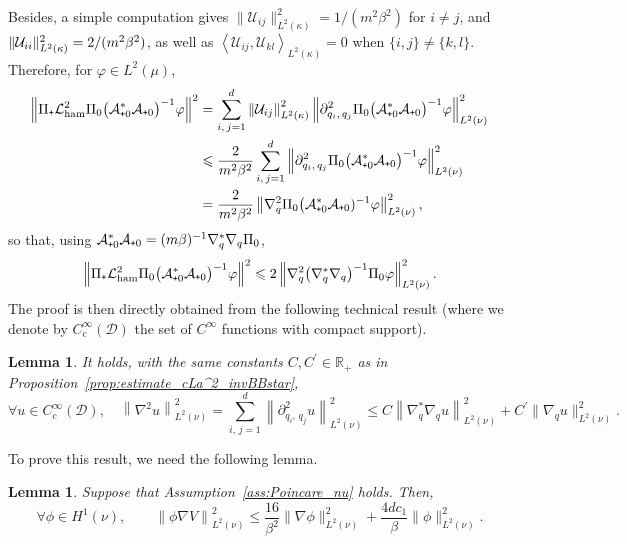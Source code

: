 \documentclass[10pt]{amsart}
\newtheorem{lemm}[theo]{Lemma}\newtheorem{prop}[theo]{Proposition}\newtheorem{coro}[theo]{Corollary}\newtheorem{conj}[theo]{Conjecture}
\theoremstyle{definition}\newtheorem{defi}[theo]{Definition}\newtheorem{rema}[theo]{Remark}\newtheorem{exam}[theo]{Example}\newtheorem{exem}[theo]{Example}\newtheorem{nota}[theo]{Notation}
\newcommand{\rmc}{\mathrm{c}}
\newcommand{\cLa}{\mathcal{A}}
\newcommand{\cD}{\mathcal{D}}
\newcommand{\cLU}{\mathcal{U}}
\newcommand{\R}{\mathbb{R}}
\newcommand{\cLham}{\mathcal{L}_{\rm ham}}
\newcommand{\subplus}{\textnormal{\texttt{+}}}
\renewcommand{\leq}{\leqslant}
\let\oldforall\forall
\renewcommand*{\forall}{\mathrel{\oldforall}}
\begin{document}
Besides, a simple computation gives $\|\cLU_{ij}\|_{L^2(\kappa)}^2 = 1/(m^2\beta^2)$ for $i\neq j$, and $\|\cLU_{ii}\|_{L^2(\kappa)}^2\linebreak = 2/(m^2\beta^2)$, as well as $\left \langle \cLU_{ij},\cLU_{kl}\right\rangle_{L^2(\kappa)} = 0$ when $\{i,j\} \neq \{k,l\}$. Therefore, for $\varphi \in L^2(\mu)$,
\begingroup
\allowdisplaybreaks
\begin{align*}
\left\|\Pi_\subplus\cLham^2 \Pi_0 \big(\cLa_{\subplus 0}^*\cLa_{\subplus 0}\big)^{-1} \varphi \right\|^2
&= \sum_{i,\,j=1}^d \left\|\cLU_{ij}\right\|_{L^2(\kappa)}^2 \left\| \partial_{q_i,\,q_j}^2 \Pi_0 \big(\cLa_{\subplus 0}^*\cLa_{\subplus 0}\big)^{-1}\varphi \right\|^2_{L^2(\nu)} \\
& \leq \frac{2}{m^2 \beta^2} \sum_{i,\,j=1}^d \left\| \partial_{q_i,\,q_j}^2 \Pi_0 \big(\cLa_{\subplus 0}^*\cLa_{\subplus 0}\big)^{-1}\varphi \right\|^2_{L^2(\nu)}
\\
&= \frac{2}{m^2 \beta^2} \left\| \nabla_q^2\Pi_0 \big(\cLa_{\subplus 0}^*\cLa_{\subplus 0})^{-1}\varphi \right\|_{L^2(\nu)}^2,
\end{align*}
\endgroup
so that, using $\cLa_{\subplus 0}^*\cLa_{\subplus 0} = (m\beta)^{-1} \nabla_q^*\nabla_q \Pi_0$,
\[
\left\|\Pi_\subplus\cLham^2 \Pi_0 \big(\cLa_{\subplus 0}^*\cLa_{\subplus 0}\big)^{-1} \varphi \right\|^2 \leq 2 \left\| \nabla_q^2 \big(\nabla_q^*\nabla_q\big)^{-1}\Pi_0 \varphi \right\|_{L^2(\nu)}^2.
\]
The proof is then directly obtained from the following technical result (where we denote by $C_\rmc^\infty(\cD)$ the set of $C^\infty$ functions with compact support).

\begin{lemm}\label{controlH2}
It holds, with the same constants $C,C^{'} \in
\R_+$ as in Proposition~\ref{prop:estimate_cLa^2_invBBstar},
\[
\forall u\in C_\rmc^\infty(\cD), \quad \left\| \nabla^2 u \right\|^2_{L^2(\nu)} = \sum_{i,\,j=1}^d \left\|\partial_{q_i,\,q_j}^2 u\right\|^2_{L^2(\nu)} \leq C\left\|\nabla_q^{*}\nabla_q u\right\|^2_{L^2(\nu)} + C^{'}\big\|\nabla_{q}u\big\|^2_{L^2(\nu)}.
\]
\end{lemm}


To prove this result, we need the following lemma.

\begin{lemm}\label{lem:VillaniA24}
Suppose that Assumption~\ref{ass:Poincare_nu} holds. Then,
\begin{equation}\label{Villanilemma}
\forall \phi \in H^{1}(\nu),
\qquad
\left\| \phi \nabla V\right\|^2_{L^2(\nu)} \leq \frac{16}{\beta^2} \|\nabla \phi\|^2_{L^2(\nu)} + \frac{4d c_1}{\beta} \|\phi\|^2_{L^2(\nu)}.
\end{equation}
\end{lemm}
\end{document}
